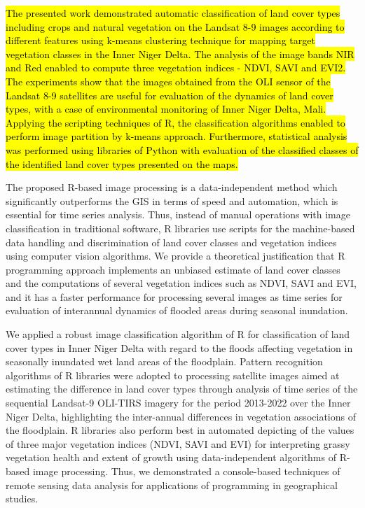 \documentclass[12pt,a4paper,oneside]{article}
\def \newpar{\vspace{6pt}}
\begin{document}
\hl{The presented work demonstrated automatic classification of land cover types including crops and natural vegetation on the Landsat 8-9 images according to different features using k-means clustering technique for mapping target vegetation classes in the Inner Niger Delta. The analysis of the image bands NIR and Red enabled to compute three vegetation indices - NDVI, SAVI and EVI2. The experiments show that the images obtained from the OLI sensor of the Landsat 8-9 satellites are useful for evaluation of the dynamics of land cover types, with a case of environmental monitoring of Inner Niger Delta, Mali. Applying the scripting techniques of R, the classification algorithms enabled to perform image partition by k-means approach. Furthermore, statistical analysis was performed using libraries of Python with evaluation of the classified classes of the identified land cover types presented on the maps.}

\newpar The proposed R-based image processing is a data-independent method which significantly outperforms the GIS in terms of speed and automation, which is essential for time series analysis. Thus, instead of manual operations with image classification in traditional software, R libraries use scripts for the machine-based data handling and discrimination of land cover classes and vegetation indices using computer vision algorithms. We provide a theoretical justification that R programming approach implements an unbiased estimate of land cover classes and the computations of several vegetation indices such as NDVI, SAVI and EVI, and it has a faster performance for processing several images as time series for evaluation of interannual dynamics of flooded areas during seasonal inundation. 

\newpar We applied a robust image classification algorithm of R for classification of land cover types in Inner Niger Delta with regard to the floods affecting vegetation in seasonally inundated wet land areas of the floodplain. Pattern recognition algorithms of R libraries were adopted to processing satellite images aimed at estimating the difference in land cover types through analysis of time series of the sequential Landsat-9 OLI-TIRS imagery for the period 2013-2022 over the Inner Niger Delta, highlighting the inter-annual differences in vegetation associations of the floodplain. R libraries also perform best in automated depicting of the values of three major vegetation indices (NDVI, SAVI and EVI) for interpreting grassy vegetation health and extent of growth using data-independent algorithms of R-based image processing. Thus, we demonstrated a console-based techniques of remote sensing data analysis for applications of programming in geographical studies. 
\end{document}
